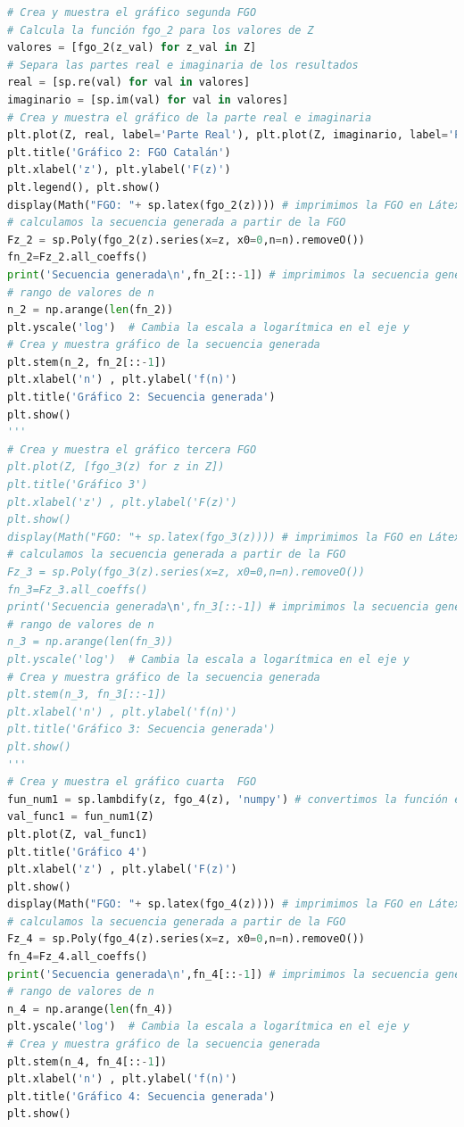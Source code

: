 \begin{enumerate}
\begin{lstlisting}[language=Python]
# Crea y muestra el gráfico segunda FGO
# Calcula la función fgo_2 para los valores de Z
valores = [fgo_2(z_val) for z_val in Z]
# Separa las partes real e imaginaria de los resultados
real = [sp.re(val) for val in valores]
imaginario = [sp.im(val) for val in valores]
# Crea y muestra el gráfico de la parte real e imaginaria
plt.plot(Z, real, label='Parte Real'), plt.plot(Z, imaginario, label='Parte Imaginaria')
plt.title('Gráfico 2: FGO Catalán')
plt.xlabel('z'), plt.ylabel('F(z)')
plt.legend(), plt.show()
display(Math("FGO: "+ sp.latex(fgo_2(z)))) # imprimimos la FGO en Látex
# calculamos la secuencia generada a partir de la FGO
Fz_2 = sp.Poly(fgo_2(z).series(x=z, x0=0,n=n).removeO())
fn_2=Fz_2.all_coeffs()
print('Secuencia generada\n',fn_2[::-1]) # imprimimos la secuencia generada
# rango de valores de n
n_2 = np.arange(len(fn_2))
plt.yscale('log')  # Cambia la escala a logarítmica en el eje y
# Crea y muestra gráfico de la secuencia generada
plt.stem(n_2, fn_2[::-1])
plt.xlabel('n') , plt.ylabel('f(n)')
plt.title('Gráfico 2: Secuencia generada')
plt.show()
'''
# Crea y muestra el gráfico tercera FGO
plt.plot(Z, [fgo_3(z) for z in Z])
plt.title('Gráfico 3')
plt.xlabel('z') , plt.ylabel('F(z)')
plt.show()
display(Math("FGO: "+ sp.latex(fgo_3(z)))) # imprimimos la FGO en Látex
# calculamos la secuencia generada a partir de la FGO
Fz_3 = sp.Poly(fgo_3(z).series(x=z, x0=0,n=n).removeO())
fn_3=Fz_3.all_coeffs()
print('Secuencia generada\n',fn_3[::-1]) # imprimimos la secuencia generada
# rango de valores de n
n_3 = np.arange(len(fn_3))
plt.yscale('log')  # Cambia la escala a logarítmica en el eje y
# Crea y muestra gráfico de la secuencia generada
plt.stem(n_3, fn_3[::-1])
plt.xlabel('n') , plt.ylabel('f(n)')
plt.title('Gráfico 3: Secuencia generada')
plt.show()
'''
# Crea y muestra el gráfico cuarta  FGO
fun_num1 = sp.lambdify(z, fgo_4(z), 'numpy') # convertimos la función en una función numérica
val_func1 = fun_num1(Z)
plt.plot(Z, val_func1)
plt.title('Gráfico 4')
plt.xlabel('z') , plt.ylabel('F(z)')
plt.show()
display(Math("FGO: "+ sp.latex(fgo_4(z)))) # imprimimos la FGO en Látex
# calculamos la secuencia generada a partir de la FGO
Fz_4 = sp.Poly(fgo_4(z).series(x=z, x0=0,n=n).removeO())
fn_4=Fz_4.all_coeffs()
print('Secuencia generada\n',fn_4[::-1]) # imprimimos la secuencia generada
# rango de valores de n
n_4 = np.arange(len(fn_4))
plt.yscale('log')  # Cambia la escala a logarítmica en el eje y
# Crea y muestra gráfico de la secuencia generada
plt.stem(n_4, fn_4[::-1])
plt.xlabel('n') , plt.ylabel('f(n)')
plt.title('Gráfico 4: Secuencia generada')
plt.show()



\end{lstlisting}
\end{enumerate}
